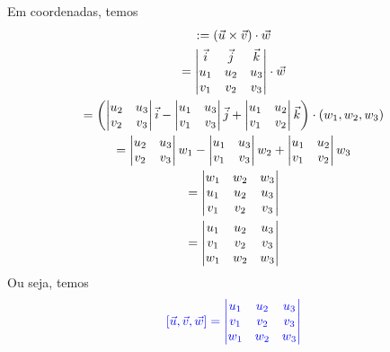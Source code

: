Em coordenadas, temos
\begin{gather}
  [\vec{u},\vec{v},\vec{w}] := (\vec{u}\cross\vec{v})\cdot\vec{w} \\
  = \begin{vmatrix}
    \vec{i} & \vec{j} & \vec{k} \\
    u_1 & u_2 & u_3 \\
    v_1 & v_2 & v_3
  \end{vmatrix} \cdot \vec{w} \\
  = \left(
    \begin{vmatrix}
      u_2 & u_3\\
      v_2 & v_3
    \end{vmatrix}\vec{i} -
    \begin{vmatrix}
      u_1 & u_3 \\
      v_1 & v_3
    \end{vmatrix}\vec{j}  +
    \begin{vmatrix}
      u_1 & u_2\\
      v_1 & v_2
    \end{vmatrix}\vec{k}\right)\cdot(w_1,w_2,w_3)\\
  = \begin{vmatrix}
    u_2 & u_3\\
    v_2 & v_3
  \end{vmatrix}w_1 -
  \begin{vmatrix}
    u_1 & u_3 \\
    v_1 & v_3
  \end{vmatrix}w_2
  + \begin{vmatrix}
    u_1 & u_2\\
    v_1 & v_2
  \end{vmatrix}w_3\\
  = \begin{vmatrix}
    w_1 & w_2 & w_3 \\
    u_1 & u_2 & u_3 \\
    v_1 & v_2 & v_3
  \end{vmatrix} \\
  = \begin{vmatrix}
    u_1 & u_2 & u_3 \\
    v_1 & v_2 & v_3 \\
    w_1 & w_2 & w_3 
  \end{vmatrix}
\end{gather}
Ou seja, temos
\begin{equation}
  {\color{blue}[\vec{u},\vec{v},\vec{w}] = \begin{vmatrix}
    u_1 & u_2 & u_3 \\
    v_1 & v_2 & v_3 \\
    w_1 & w_2 & w_3 
  \end{vmatrix}}
\end{equation}

